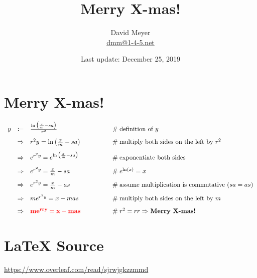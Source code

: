 \documentclass[11pt, oneside]{article}
\title{Merry X-mas!}
\author{David Meyer \\ \href{mailto:dmm@1-4-5.net}{dmm@1-4-5.net}}
\date{Last update: December 25, 2019}
\begin{document}
\maketitle

\section{Merry X-mas!}

\bigskip
\Large {
  \begin{equation*}
   \begin{array}{rcll} 
		y
		&\coloneqq& \frac{\ln \big (\frac{x}{m} -  sa  \big ) }{r^2}                                              
				&\qquad \qquad \mathrel{\#} \text{definition of $y$} \\
[8pt]
		&\Rightarrow& r^2 y = \ln \big (\frac{x}{m} -  sa  \big )    
				&\qquad \qquad  \mathrel{\#} \text{multiply both sides on the left by $r^2$} \\
[8pt]
		&\Rightarrow& e^{r^2y} = e^{\ln \big ( \frac{x}{m} -  sa\big )}                           
				&\qquad \qquad \mathrel{\#} \text{exponentiate both sides} \\
[8pt]
		&\Rightarrow& e^{r^2y} = \frac{x}{m} -  sa                           
				&\qquad \qquad \mathrel{\#} e^{\ln(x)} = x \\
[8pt]
		&\Rightarrow& e^{r^2y} = \frac{x}{m} -  as						
				&\qquad \qquad \mathrel{\#} \text{assume multiplication is commutative $(sa = as)$} \\ 
[8pt]
		&\Rightarrow& m e^{r^2y} = x - mas                                        
				&\qquad \qquad \mathrel{\#} \text{multiply both sides on the left by $m$} \\
[8pt]
		&\Rightarrow& \bf{\color{red}{m e^{rry} = x - mas}}                                     
				&\qquad \qquad \mathrel{\#} \text{$r^2 = rr \Rightarrow$ \bf{Merry X-mas!}}
    \end{array}
   \end{equation*}
}

%
%
\section{\LaTeX \hspace{0.1mm} Source}
\url{https://www.overleaf.com/read/sjrwjgkzzmmd}
\end{document}

